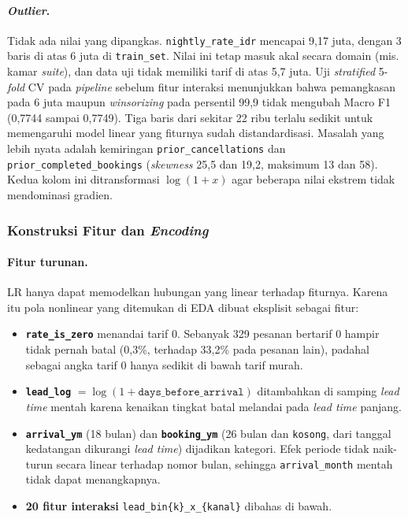 \paragraph{\textit{Outlier}.} Tidak ada nilai yang dipangkas. \texttt{nightly\_rate\_idr} mencapai 9,17 juta, dengan 3 baris di atas 6 juta di \texttt{train\_set}. Nilai ini tetap masuk akal secara domain (mis. kamar \textit{suite}), dan data uji tidak memiliki tarif di atas 5,7 juta. Uji \textit{stratified} 5-\textit{fold} CV pada \textit{pipeline} sebelum fitur interaksi menunjukkan bahwa pemangkasan pada 6 juta maupun \textit{winsorizing} pada persentil 99,9 tidak mengubah Macro F1 (0,7744 sampai 0,7749). Tiga baris dari sekitar 22 ribu terlalu sedikit untuk memengaruhi model linear yang fiturnya sudah distandardisasi. Masalah yang lebih nyata adalah kemiringan \texttt{prior\_cancellations} dan \texttt{prior\_completed\_bookings} (\textit{skewness} 25,5 dan 19,2, maksimum 13 dan 58). Kedua kolom ini ditransformasi $\log(1 + x)$ agar beberapa nilai ekstrem tidak mendominasi gradien.

\subsubsection{Konstruksi Fitur dan \textit{Encoding}}
\paragraph{Fitur turunan.} LR hanya dapat memodelkan hubungan yang linear terhadap fiturnya. Karena itu pola nonlinear yang ditemukan di EDA dibuat eksplisit sebagai fitur:
\begin{itemize}
	\item \textbf{\texttt{rate\_is\_zero}} menandai tarif 0. Sebanyak 329 pesanan bertarif 0 hampir tidak pernah batal (0,3\%, terhadap 33,2\% pada pesanan lain), padahal sebagai angka tarif 0 hanya sedikit di bawah tarif murah.
	\item \textbf{\texttt{lead\_log}} $= \log(1 + \texttt{days\_before\_arrival})$ ditambahkan di samping \textit{lead time} mentah karena kenaikan tingkat batal melandai pada \textit{lead time} panjang.
	\item \textbf{\texttt{arrival\_ym}} (18 bulan) dan \textbf{\texttt{booking\_ym}} (26 bulan dan \texttt{kosong}, dari tanggal kedatangan dikurangi \textit{lead time}) dijadikan kategori. Efek periode tidak naik-turun secara linear terhadap nomor bulan, sehingga \texttt{arrival\_month} mentah tidak dapat menangkapnya.
	\item \textbf{20 fitur interaksi} \texttt{lead\_bin\{k\}\_x\_\{kanal\}} dibahas di bawah.
\end{itemize}

